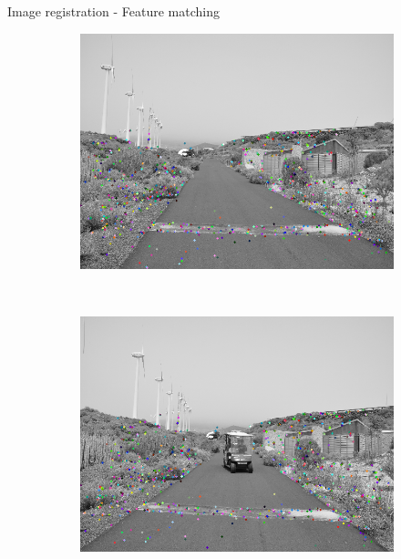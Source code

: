 \begin{frame}{Image registration - Feature matching}
  \begin{center}
      \begin{figure}[h!]
	\begin{subfigure}[b]{0.45\textwidth}
		\includegraphics[width=\textwidth]{matches1}
	\end{subfigure}%
	~
	\begin{subfigure}[b]{0.45\textwidth}
		\includegraphics[width=\textwidth]{matches2}
	\end{subfigure}%
      \end{figure}
    \end{center}

  \note {
  
  }
\end{frame}

